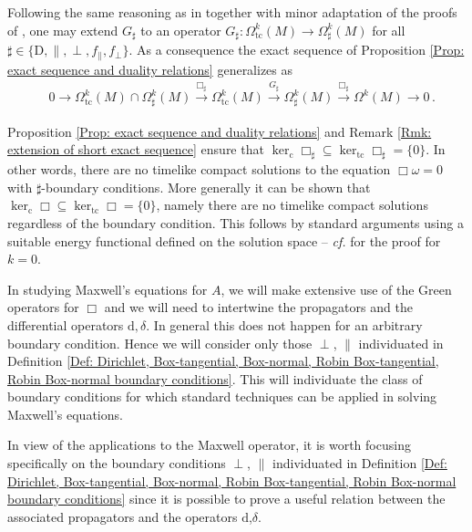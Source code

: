 \begin{remark}\label{Rmk: extension of short exact sequence}
	Following the same reasoning as in \cite{Baer-15} together with minor adaptation of the proofs of \cite{Dappiaggi-Drago-Ferreira-19}, one may extend $G_\sharp$ to an operator $G_\sharp\colon\Omega_{\mathrm{tc}}^k(M)\to\Omega^k_\sharp(M)$ for all $\sharp\in\{\mathrm{D},\parallel,\perp,f_\parallel,f_\perp\}$.
	As a consequence the exact sequence of Proposition \ref{Prop: exact sequence and duality relations} generalizes as
	\begin{align}\label{Eqn: short exact sequence for timelike k-forms}
	&0\to\Omega_{\mathrm{tc}}^k(M)\cap\Omega_\sharp^k(M)\stackrel{\Box_\sharp}{\longrightarrow}
	\Omega_{\mathrm{tc}}^k(M)\stackrel{G_\sharp}{\longrightarrow}
	\Omega_\sharp^k(M)\stackrel{\Box_\sharp}{\longrightarrow}
	\Omega^k(M)\to 0\,.
	\end{align}
\end{remark}

\begin{remark}\label{Rmk: compactly supported solutions of the wave operator}
	Proposition \ref{Prop: exact sequence and duality relations} and Remark \ref{Rmk: extension of short exact sequence} ensure that $\ker_{\mathrm{c}}\Box_\sharp\subseteq\ker_{\mathrm{tc}}\Box_\sharp=\lbrace 0\rbrace$. In other words, there are no timelike compact solutions to the equation $\Box\omega=0$ with $\sharp$-boundary conditions.
	More generally it can be shown that $\ker_{\mathrm{c}}\Box\subseteq\ker_{\mathrm{tc}}\Box=\lbrace 0 \rbrace$, namely there are no timelike compact solutions regardless of the boundary condition.
	This follows by standard arguments using a suitable energy functional defined on the solution space -- \textit{cf.} \cite[Thm. 30]{Dappiaggi-Drago-Ferreira-19} for the proof for $k=0$.
\end{remark}

In studying Maxwell's equations for $A$, we will make extensive use of the Green operators for $\Box$ and we will need to intertwine the propagators and the differential operators $\mathrm{d},\delta$. In general this does not happen for an arbitrary boundary condition. Hence we will consider only those $\perp$, $\parallel$ individuated in Definition \ref{Def: Dirichlet, Box-tangential, Box-normal, Robin Box-tangential, Robin Box-normal boundary conditions}. This will individuate the class of boundary conditions for which standard techniques can be applied in solving Maxwell's equations.


In view of the applications to the Maxwell operator, it is worth focusing specifically on the boundary conditions $\perp$, $\parallel$ individuated in Definition \ref{Def: Dirichlet, Box-tangential, Box-normal, Robin Box-tangential, Robin Box-normal boundary conditions} since it is possible to prove a useful relation between the associated propagators and the operators $\mathrm{d}$,$\delta$.

